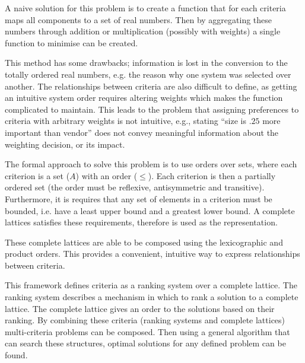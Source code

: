 A naive solution for this problem is to create a function that for each criteria maps all components to a set of real numbers.
Then by aggregating these numbers through addition or multiplication (possibly with weights) a single function to minimise can be created. 

This method has some drawbacks;
information is lost in the conversion to the totally ordered real numbers,
e.g. the reason why one system was selected over another.
The relationships between criteria are also difficult to define, as getting an intuitive system order requires altering weights which makes the function complicated to maintain.
This leads to the problem that assigning preferences to criteria with arbitrary weights is not intuitive,
e.g., stating ``size is $.25$ more important than vendor'' does not convey meaningful information about the weighting decision, or its impact.

The formal approach to solve this problem is to use orders over sets, 
where each criterion is a set ($A$) with an order ($\leq$).
Each criterion is then a partially ordered set (the order must be reflexive, antisymmetric and transitive).
Furthermore, it is requires that any set of elements in a criterion must be bounded, 
i.e. have a least upper bound and a greatest lower bound.
A complete lattices satisfies these requirements, therefore is used as the representation. 

These complete lattices are able to be composed using the lexicographic and product orders.
This provides a convenient, intuitive way to express relationships between criteria.

This framework defines criteria as a ranking system over a complete lattice.
The ranking system describes a mechanism in which to rank a solution to a complete lattice. 
The complete lattice gives an order to the solutions based on their ranking.
By combining these criteria (ranking systems and complete lattices) multi-criteria problems can be composed.
Then using a general algorithm that can search these structures, 
optimal solutions for any defined problem can be found.

